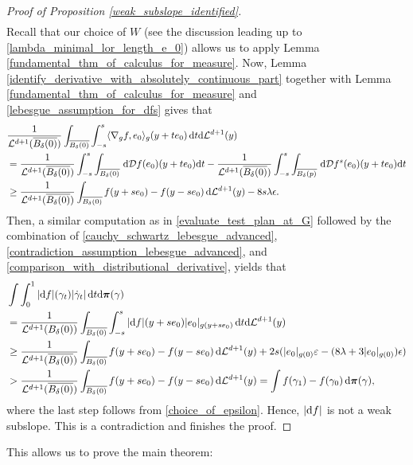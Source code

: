 \documentclass[a4paper,10pt]{article}
\numberwithin{equation}{section}
\newcommand{\e}{\varepsilon}
\newcommand{\di}{{\rm d}}
\begin{document}
\begin{proof}[Proof of Proposition \ref{weak_subslope_identified}]
\begin{align}
\end{align}
Recall that our choice of $W$ (see the discussion leading up to \eqref{lambda_minimal_lor_length_e_0}) allows us to apply Lemma \ref{fundamental_thm_of_calculus_for_measure}.
Now, Lemma \ref{identify_derivative_with_absolutely_continuous_part} together with Lemma \ref{fundamental_thm_of_calculus_for_measure} and \eqref{lebesgue_assumption_for_dfs} gives that 
\begin{align}\label{comparison_with_distributional_derivative}
    &\frac{1}{\mathcal{L}^{d+1}(\overline{B_\delta(0)})} \int_{\overline{B_\delta(0)}}  \int_{-s}^s \langle \nabla_g f, e_0\rangle_g(y +te_0) \, \di t \di \mathcal{L}^{d+1}(y) \nonumber \\
    &= \frac{1}{\mathcal{L}^{d+1}(\overline{B_\delta(0)})} \int_{-s}^s \int_{\overline{B_\delta(0)}}  \, \di \mathcal{D}f(e_0)(y +te_0) \di t - \frac{1}{\mathcal{L}^{d+1}(\overline{B_\delta(0)})} \int_{-s}^s \int_{\overline{B_\delta(p)}}  \, \di \mathcal{D}f^s(e_0)(y +te_0) \di t \nonumber \\
    &\geq \frac{1}{\mathcal{L}^{d+1}(\overline{B_\delta(0)})} \int_{\overline{B_\delta(0)}} f(y+se_0)-f(y-se_0) \, \di \mathcal{L}^{d+1}(y) -8 s\lambda \epsilon.  
\end{align}
Then, a similar computation as in \eqref{evaluate_test_plan_at_G} followed by the combination of \eqref{cauchy_schwartz_lebesgue_advanced}, \eqref{contradiction_assumption_lebesgue_advanced}, and \eqref{comparison_with_distributional_derivative}, yields that
\begin{align}
     &\int \int_0^1 |\di f|(\gamma_t)|\dot{\gamma}_t|\, \di t \di \boldsymbol{\pi}(\gamma) \\
     &=\frac{1}{\mathcal{L}^{d+1}(B_\delta(0))} \int_{\overline{B_\delta(0)}}  \int_{-s}^s |\di f|(y+se_0)|e_0|_{g(y+se_0)}\,\di t\di \mathcal{L}^{d+1}(y) \nonumber \\
    &\geq \frac{1}{\mathcal{L}^{d+1}(\overline{B_\delta(0)})} \int_{\overline{B_\delta(0)}} f(y+se_0)-f(y-se_0)\, \di \mathcal{L}^{d+1}(y) + 2s(|e_0|_{g(0)}\e - (8\lambda+3|e_0|_{g(0)})\epsilon) \nonumber\\
    &> \frac{1}{\mathcal{L}^{d+1}(\overline{B_\delta(0)})} \int_{\overline{B_\delta(0)}} f(y+se_0)-f(y-se_0)\, \di \mathcal{L}^{d+1}(y) =\int f(\gamma_1)-f(\gamma_0)\, \di \boldsymbol{\pi}(\gamma),
\end{align}
where the last step follows from \eqref{choice_of_epsilon}. Hence, $|\di f|$ is not a weak subslope. This is a contradiction and finishes the proof.
\end{proof}
This allows us to prove the main theorem:
\smallskip
\end{document}
